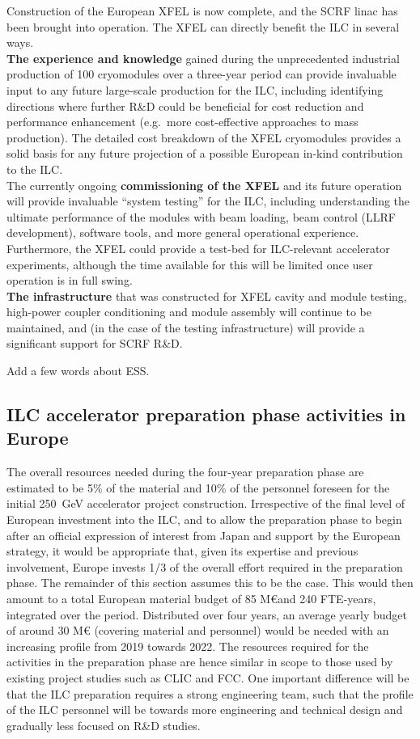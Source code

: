 \documentclass[%
 reprint,
 amsmath,amssymb,
 aps,
]{revtex4-1}
\begin{document}
Construction of the European XFEL is now complete, and the SCRF linac has been brought into operation. The XFEL can directly benefit the ILC in several ways. \\
{\bf The experience and knowledge} gained during the unprecedented industrial
production of 100 cryomodules over a three-year period can provide 
invaluable input to any future large-scale production for the ILC, including 
identifying directions where further R\&D could be beneficial for cost reduction and performance enhancement (e.g.\ more cost-effective approaches to mass  production). The detailed cost breakdown of the XFEL cryomodules provides a solid basis for any future projection of a possible European in-kind contribution to the ILC. \\
The currently ongoing {\bf commissioning of the XFEL} and its future operation will provide invaluable ``system testing'' for the ILC, including understanding the ultimate performance of the modules with beam loading, beam control (LLRF development), software tools, and more general operational experience. Furthermore, the XFEL could provide a test-bed for ILC-relevant accelerator experiments, although the time available for this will be limited once user operation is in full swing. \\
{\bf The infrastructure} that was constructed for XFEL cavity and module 
testing, high-power coupler conditioning and module assembly will continue to be maintained, and (in the case of the testing infrastructure) will provide a significant support for SCRF R\&D.

Add a few words about ESS. 

\subsection{ILC accelerator preparation phase activities in Europe ~\label{sec:prepphase:accelerator}}

The overall resources needed during the four-year preparation phase are estimated to be 5\% of the material and 10\% of the personnel foreseen for the initial 250~GeV accelerator project construction. Irrespective of the final level of European investment into the ILC, and to allow the preparation phase to begin after an official expression of interest from Japan and support by the European strategy, it would be appropriate that, given its expertise and previous involvement, Europe invests 1/3 of the overall effort required in the preparation phase. The remainder of this section assumes this to be the case. This would then amount to a total European material budget of 85 M\euro and 240 FTE-years, integrated over the period.
Distributed over four years, an average yearly budget of around 30 M\euro{} (covering material and personnel) would be needed with an increasing profile from 2019 towards 2022. The resources required for the activities in the preparation phase are hence similar in scope to those used by existing project studies such as CLIC and FCC. One important difference will be that the ILC preparation requires a strong engineering team, such that the profile of the ILC personnel will be towards more engineering and technical design and gradually less focused on R\&D studies.
\end{document}
